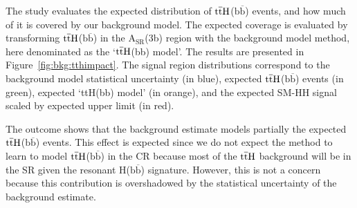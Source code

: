 The study evaluates the expected distribution of $\mathrm{t\overline{t}H}$($\mathrm{b\overline{b}}$) events, and how much of it is covered by our background model. The expected coverage is evaluated by transforming $\mathrm{t\overline{t}H}$($\mathrm{b\overline{b}}$) in the $\mathrm{A_{SR}}$(3b) region with the background model method, here denominated as the `$\mathrm{t\overline{t}H}$(bb) model'. The results are presented in Figure~\ref{fig:bkg:tthimpact}. The signal region distributions correspond to the background model statistical uncertainty (in blue), expected $\mathrm{t\overline{t}H}$($\mathrm{b\overline{b}}$) events (in green), expected `ttH(bb) model' (in orange), and the expected SM-HH signal scaled by expected upper limit (in red). 

The outcome shows that the background estimate models partially the expected $\mathrm{t\overline{t}H}$($\mathrm{b\overline{b}}$) events. This effect is expected since we do not expect the method to learn to model $\mathrm{t\overline{t}H}$($\mathrm{b\overline{b}}$) in the CR because most of the $\mathrm{t\overline{t}H}$ background will be in the SR given the resonant H($\mathrm{b\overline{b}}$) signature. However, this is not a concern because this contribution is overshadowed by the statistical uncertainty of the background estimate.

